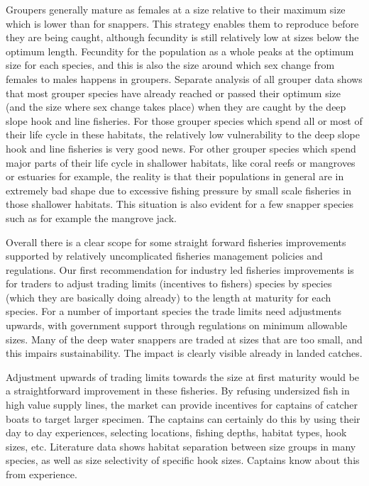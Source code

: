Groupers generally mature as females at a size relative to their maximum size which is lower than for snappers. This strategy enables them to reproduce before they are being caught, although fecundity is still relatively low at sizes below the optimum length. Fecundity for the population as a whole peaks at the optimum size for each species, and this is also the size around which sex change from females to males happens in groupers. Separate analysis of all grouper data shows that most grouper species have already reached or passed their optimum size (and the size where sex change takes place) when they are caught by the deep slope hook and line fisheries.
\clearpage
\newpage
For those grouper species which spend all or most of their life cycle in these habitats, the relatively low vulnerability to the deep slope hook and line fisheries is very good news. For other grouper species which spend major parts of their life cycle in shallower habitats, like coral reefs or mangroves or estuaries for example, the reality is that their populations in general are in extremely bad shape due to excessive fishing pressure by small scale fisheries in those shallower habitats. This situation is also evident for a few snapper species such as for example the mangrove jack.

Overall there is a clear scope for some straight forward fisheries improvements supported by relatively uncomplicated fisheries management policies and regulations. Our first recommendation for industry led fisheries improvements is for traders to adjust trading limits (incentives to fishers) species by species (which they are basically doing already) to the length at maturity for each species. For a number of important species the trade limits need adjustments upwards, with government support through regulations on minimum allowable sizes. Many of the deep water snappers are traded at sizes that are too small, and this impairs sustainability. The impact is clearly visible already in landed catches.

Adjustment upwards of trading limits towards the size at first maturity would be a straightforward improvement in these fisheries. By refusing undersized fish in high value supply lines, the market can provide incentives for captains of catcher boats to target larger specimen. The captains can certainly do this by using their day to day experiences, selecting locations, fishing depths, habitat types, hook sizes, etc. Literature data shows habitat separation between size groups in many species, as well as size selectivity of specific hook sizes. Captains know about this from experience.

